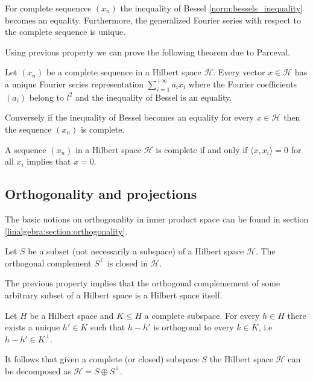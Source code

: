 	\begin{property}
		For complete sequences $(x_n)$ the inequality of Bessel \ref{norm:bessels_inequality} becomes an equality. Furthermore, the generalized Fourier series with respect to the complete sequence is unique.
	\end{property}
	
	Using previous property we can prove the following theorem due to Parceval.
	\begin{theorem}[Parceval]
		Let $(x_n)$ be a complete sequence in a Hilbert space $\mathcal{H}$. Every vector $x\in\mathcal{H}$ has a unique Fourier series representation $\sum_{i=1}^{+\infty}a_ix_i$ where the Fourier coefficients $(a_i)$ belong to $l^2$ and the inequality of Bessel is an equality.
		
		Conversely if the inequality of Bessel becomes an equality for every $x\in\mathcal{H}$ then the sequence $(x_n)$ is complete.
	\end{theorem}
	
	\begin{property}
		A sequence $(x_n)$ in a Hilbert space $\mathcal{H}$ is complete if and only if $\langle x, x_i\rangle = 0$ for all $x_i$ implies that $x=0$.
	\end{property}

\subsection{Orthogonality and projections}

	The basic notions on orthogonality in inner product space can be found in section \ref{linalgebra:section:orthogonality}.

	\begin{property}
		Let $S$ be a subset (not necessarily a subspace) of a Hilbert space $\mathcal{H}$. The orthogonal complement $S^\perp$ is closed in $\mathcal{H}$.
	\end{property}
	\begin{result}
		The previous property implies that the orthogonal complemement of some arbitrary subset of a Hilbert space is a Hilbert space itself.
	\end{result}
	
	\begin{theorem}
		\label{linalgebra:theorem:projection_theorem}
		Let $H$ be a Hilbert space and $K\leq H$ a complete subspace. For every $h\in H$ there exists a unique $h'\in K$ such that $h-h'$ is orthogonal to every $k\in K$, i.e $h-h'\in K^\perp$.
	\end{theorem}
	\begin{result}
		It follows that given a complete (or closed) subspace $S$ the Hilbert space $\mathcal{H}$ can be decomposed as $\mathcal{H} = S\oplus S^\perp$.
	\end{result}
	

